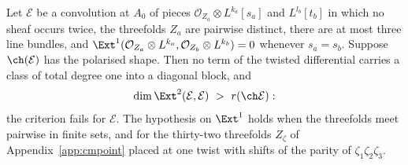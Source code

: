 \begin{proposition}\label{prop:separated}
Let $\mathcal{E}$ be a convolution at $A_{0}$ of pieces $\mathcal{O}_{Z_{a}}\otimes L^{k_{a}}[s_{a}]$ and $L^{l_{b}}[t_{b}]$ in which no sheaf occurs twice, the threefolds $Z_{a}$ are pairwise distinct, there are at most three line bundles, and $\Ext^{1}(\mathcal{O}_{Z_{a}}\otimes L^{k_{a}},\mathcal{O}_{Z_{b}}\otimes L^{k_{b}})=0$ whenever $s_{a}=s_{b}$. Suppose $\ch(\mathcal{E})$ has the polarised shape. Then no term of the twisted differential carries a class of total degree one into a diagonal block, and
\[
\dim\Ext^{2}(\mathcal{E},\mathcal{E})\ >\ r(\ch\mathcal{E}):
\]
the criterion fails for $\mathcal{E}$. The hypothesis on $\Ext^{1}$ holds when the threefolds meet pairwise in finite sets, and for the thirty-two threefolds $Z_{\zeta}$ of Appendix~\ref{app:cmpoint} placed at one twist with shifts of the parity of $\zeta_{1}\zeta_{2}\zeta_{3}$.
\end{proposition}

